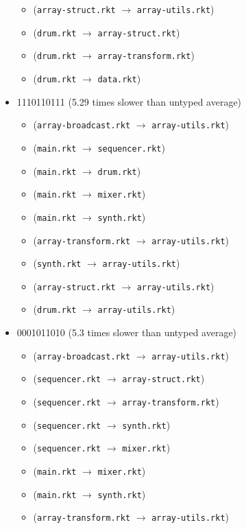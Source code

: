 \documentclass{article}
\newcommand{\mono}[1]{\texttt{#1}}
\begin{document}
\begin{itemize}
\begin{itemize}
  \item (\mono{array-struct.rkt} $\rightarrow$ \mono{array-utils.rkt})
  \item (\mono{drum.rkt} $\rightarrow$ \mono{array-struct.rkt})
  \item (\mono{drum.rkt} $\rightarrow$ \mono{array-transform.rkt})
  \item (\mono{drum.rkt} $\rightarrow$ \mono{data.rkt})
  \end{itemize}
\item 1110110111 (5.29 times slower than untyped average)
  \begin{itemize}
  \item (\mono{array-broadcast.rkt} $\rightarrow$ \mono{array-utils.rkt})
  \item (\mono{main.rkt} $\rightarrow$ \mono{sequencer.rkt})
  \item (\mono{main.rkt} $\rightarrow$ \mono{drum.rkt})
  \item (\mono{main.rkt} $\rightarrow$ \mono{mixer.rkt})
  \item (\mono{main.rkt} $\rightarrow$ \mono{synth.rkt})
  \item (\mono{array-transform.rkt} $\rightarrow$ \mono{array-utils.rkt})
  \item (\mono{synth.rkt} $\rightarrow$ \mono{array-utils.rkt})
  \item (\mono{array-struct.rkt} $\rightarrow$ \mono{array-utils.rkt})
  \item (\mono{drum.rkt} $\rightarrow$ \mono{array-utils.rkt})
  \end{itemize}
\item 0001011010 (5.3 times slower than untyped average)
  \begin{itemize}
  \item (\mono{array-broadcast.rkt} $\rightarrow$ \mono{array-utils.rkt})
  \item (\mono{sequencer.rkt} $\rightarrow$ \mono{array-struct.rkt})
  \item (\mono{sequencer.rkt} $\rightarrow$ \mono{array-transform.rkt})
  \item (\mono{sequencer.rkt} $\rightarrow$ \mono{synth.rkt})
  \item (\mono{sequencer.rkt} $\rightarrow$ \mono{mixer.rkt})
  \item (\mono{main.rkt} $\rightarrow$ \mono{mixer.rkt})
  \item (\mono{main.rkt} $\rightarrow$ \mono{synth.rkt})
  \item (\mono{array-transform.rkt} $\rightarrow$ \mono{array-utils.rkt})

\end{itemize}
\end{itemize}
\end{document}
